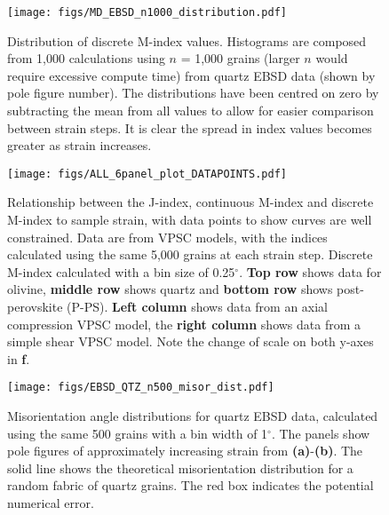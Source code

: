 \documentclass[a4paper,12pt,twoside]{report}
\numberwithin{equation}{chapter}
\begin{document}
\begin{figure}[h!]
  \centering
    \texttt{[image: figs/MD\_EBSD\_n1000\_distribution.pdf]}
  \caption[Discrete M-index distribution (Quartz EBSD)]{Distribution of discrete M-index values. Histograms are composed from 1,000 calculations using $n$ = 1,000 grains (larger $n$ would require excessive compute time) from quartz EBSD data (shown by pole figure number). The distributions have been centred on zero by subtracting the mean from all values to allow for easier comparison between strain steps. It is clear the spread in index values becomes greater as strain increases.}
  \label{fig:app:MD_EBSD_dist}
\end{figure} 

\begin{figure*}[p]
  \centering
    \texttt{[image: figs/ALL\_6panel\_plot\_DATAPOINTS.pdf]}
  \caption[Relation of indices to strain (VPSC, with data points)]{Relationship between the J-index, continuous M-index and discrete M-index to sample strain, with data points to show curves are well constrained. Data are from VPSC models, with the indices calculated using the same 5,000 grains at each strain step. Discrete M-index calculated with a bin size of 0.25$^\circ$. \textbf{Top row} shows data for olivine, \textbf{middle row} shows quartz and \textbf{bottom row} shows post-perovskite (P-PS). \textbf{Left column} shows data from an axial compression VPSC model, the \textbf{right column} shows data from a simple shear VPSC model. Note the change of scale on both y-axes in \textbf{f}.}
  \label{fig:app:indices_vs_strain_DATAPOINTS}
\end{figure*} 

\begin{figure}[h!]
  \centering
    \texttt{[image: figs/EBSD\_QTZ\_n500\_misor\_dist.pdf]}
  \caption[Misorientation angle distribution (quartz EBSD)]{Misorientation angle distributions for quartz EBSD data, calculated using the same 500 grains with a bin width of 1$^{\circ}$. The panels show pole figures of approximately increasing strain from \textbf{(a)}-\textbf{(b)}. The solid line shows the theoretical misorientation distribution for a random fabric of quartz grains. The red box indicates the potential numerical error.} 
  \label{fig:APP_misor_dist_qtz_ebsd}
\end{figure} 
\end{document}
